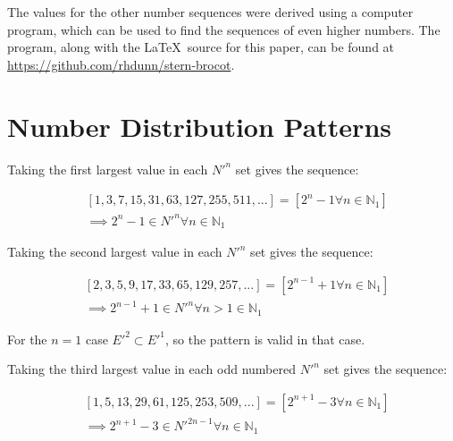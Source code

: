 \documentclass{article}
\begin{document}
\noindent
The values for the other number sequences were derived using a computer
program, which can be used to find the sequences of even higher numbers.
The program, along with the \LaTeX\ source for this paper, can be found at
\url{https://github.com/rhdunn/stern-brocot}.

\section{Number Distribution Patterns}

Taking the first largest value in each \begin{math}N'^n\end{math} set gives the
sequence:

\begin{displaymath}\begin{aligned}
& [1, 3, 7, 15, 31, 63, 127, 255, 511, ...] = [2^n-1 \forall n \in \mathbb{N}_{1}] \\
& \implies 2^n-1 \in N'^n \forall n \in \mathbb{N}_{1}
\end{aligned}\end{displaymath}

\noindent
Taking the second largest value in each \begin{math}N'^n\end{math} set gives
the sequence:

\begin{displaymath}\begin{aligned}
& [2, 3, 5, 9, 17, 33, 65, 129, 257, ...] = [2^{n-1}+1 \forall n \in \mathbb{N}_{1}] \\
& \implies 2^{n-1}+1 \in N'^n \forall n>1 \in \mathbb{N}_{1}
\end{aligned}\end{displaymath}

\noindent
For the \begin{math}n=1\end{math} case \begin{math}E'^2 \subset E'^1\end{math}, so the
pattern is valid in that case.

\noindent
Taking the third largest value in each odd numbered \begin{math}N'^n\end{math}
set gives the sequence:

\begin{displaymath}\begin{aligned}
& [1, 5, 13, 29, 61, 125, 253, 509, ...] = [2^{n+1}-3 \forall n \in \mathbb{N}_{1}] \\
& \implies 2^{n+1}-3 \in N'^{2n-1} \forall n \in \mathbb{N}_{1}
\end{aligned}\end{displaymath}
\end{document}
